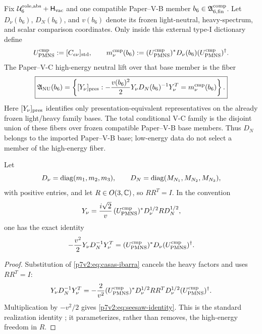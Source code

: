 \documentclass[11pt,a4paper]{article}
\newcommand{\Hvac}{\mathsf{H}_{\rm vac}}
\newcommand{\YN}{Y_\nu}
\newcommand{\Uroleabs}{\mathcal U_6^{\rm role,abs}}
\newcommand{\Acompsix}{\mathfrak A_{6,{\rm fin}}^{\rm comp}}
\begin{document}
\begin{definition}
\label{p7v2:def:nu-selector-family}
Fix \(\Uroleabs+\Hvac\) and one compatible Paper--V-B member
\(b_6\in\Acompsix\).  Let \(D_\nu(b_6)\), \(D_N(b_6)\), and \(v(b_6)\) denote
its frozen light-neutral, heavy-spectrum, and scalar comparison coordinates.
Only inside this external type-I dictionary define
\[
 U_{\rm PMNS}^{\rm cmp}:=[C_{e\nu}]_{\rm std},\qquad
 m_\nu^{\rm cmp}(b_6)
 :=(U_{\rm PMNS}^{\rm cmp})^*D_\nu(b_6)
 (U_{\rm PMNS}^{\rm cmp})^\dagger .
\]
The Paper--V-C high-energy neutral lift over that base member is the fiber
\[
\boxed{
\mathfrak A_{\rm NU}(b_6)
=
\left\{
[Y_\nu]_{\rm pres}:
-\frac{v(b_6)^2}{2}
Y_\nu D_N(b_6)^{-1}Y_\nu^T
 =m_\nu^{\rm cmp}(b_6)
\right\}.
}
\]
Here \([Y_\nu]_{\rm pres}\) identifies only presentation-equivalent
representatives on the already frozen light/heavy family bases.  The total
conditional V-C family is the disjoint union of these fibers over frozen
compatible Paper--V-B base members.  Thus \(D_N\) belongs to the imported
Paper--V-B base;
low-energy data do not select a member of the high-energy fiber.
\end{definition}

\begin{theorem}
\label{p7v2:thm:seesaw-identity}
Let
\[
 D_\nu=\operatorname{diag}(m_1,m_2,m_3),\qquad
 D_N=\operatorname{diag}(M_{N_1},M_{N_2},M_{N_3}),
\]
with positive entries, and let \(R\in O(3,\mathbb{C})\), so \(RR^T=I\).  In the
convention
\begin{equation}
\label{p7v2:eq:casas-ibarra}
 \YN
 =
 \frac{i\sqrt2}{v}\,
 (U_{\rm PMNS}^{\rm cmp})^{*}D_\nu^{1/2}R D_N^{1/2},
\end{equation}
one has the exact identity
\begin{equation}
\label{p7v2:eq:seesaw-identity}
 -\frac{v^2}{2}\YN D_N^{-1}\YN^T
 =
 (U_{\rm PMNS}^{\rm cmp})^{*}D_\nu (U_{\rm PMNS}^{\rm cmp})^{\dagger}.
\end{equation}
\end{theorem}

\begin{proof}
Substitution of \eqref{p7v2:eq:casas-ibarra} cancels the heavy factors and
uses \(RR^T=I\):
\[
 \YN D_N^{-1}\YN^T
 =
 -\frac{2}{v^2}
 (U_{\rm PMNS}^{\rm cmp})^{*}D_\nu^{1/2}
 RR^T
 D_\nu^{1/2}(U_{\rm PMNS}^{\rm cmp})^{\dagger}.
\]
Multiplication by \(-v^2/2\) gives
\eqref{p7v2:eq:seesaw-identity}.  This is the standard realization identity
\cite{CasasIbarra2001}; it parameterizes, rather than removes, the high-energy
freedom in \(R\).
\end{proof}
\end{document}
